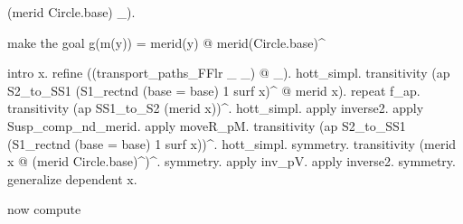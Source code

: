 \begin{coqdoccode}
\begin{coqdoccomment}
(merid\coqdocindent{0.50em}
Circle.base)\coqdocindent{0.50em}
\_).\coqdoceol
\coqdoceol
\coqdocindent{1.00em}
\begin{coqdoccomment}
\coqdocindent{0.50em}
make\coqdocindent{0.50em}
the\coqdocindent{0.50em}
goal\coqdocindent{0.50em}
g(m(y))\coqdocindent{0.50em}
=\coqdocindent{0.50em}
merid(y)\coqdocindent{0.50em}
@\coqdocindent{0.50em}
merid(Circle.base)\^{}\coqdocindent{0.50em}
\end{coqdoccomment}
\coqdoceol
\coqdocindent{1.00em}
intro\coqdocindent{0.50em}
x.\coqdoceol
\coqdocindent{2.00em}
refine\coqdocindent{0.50em}
((transport\_paths\_FFlr\coqdocindent{0.50em}
\_\coqdocindent{0.50em}
\_)\coqdocindent{0.50em}
@\coqdocindent{0.50em}
\_).\coqdocindent{0.50em}
hott\_simpl.\coqdoceol
\coqdocindent{2.00em}
transitivity\coqdocindent{0.50em}
(ap\coqdocindent{0.50em}
S2\_to\_SS1\coqdocindent{0.50em}
(S1\_rectnd\coqdocindent{0.50em}
(base\coqdocindent{0.50em}
=\coqdocindent{0.50em}
base)\coqdocindent{0.50em}
1\coqdocindent{0.50em}
surf\coqdocindent{0.50em}
x)\^{}\coqdocindent{0.50em}
@\coqdocindent{0.50em}
merid\coqdocindent{0.50em}
x).\coqdoceol
\coqdocindent{2.00em}
repeat\coqdocindent{0.50em}
f\_ap.\coqdoceol
\coqdocindent{2.00em}
transitivity\coqdocindent{0.50em}
(ap\coqdocindent{0.50em}
SS1\_to\_S2\coqdocindent{0.50em}
(merid\coqdocindent{0.50em}
x))\^{}.\coqdocindent{0.50em}
hott\_simpl.\coqdoceol
\coqdocindent{2.00em}
apply\coqdocindent{0.50em}
inverse2.\coqdoceol
\coqdocindent{2.00em}
apply\coqdocindent{0.50em}
Susp\_comp\_nd\_merid.\coqdoceol
\coqdocindent{2.00em}
apply\coqdocindent{0.50em}
moveR\_pM.\coqdoceol
\coqdocindent{2.00em}
transitivity\coqdocindent{0.50em}
(ap\coqdocindent{0.50em}
S2\_to\_SS1\coqdocindent{0.50em}
(S1\_rectnd\coqdocindent{0.50em}
(base\coqdocindent{0.50em}
=\coqdocindent{0.50em}
base)\coqdocindent{0.50em}
1\coqdocindent{0.50em}
surf\coqdocindent{0.50em}
x))\^{}.\coqdocindent{0.50em}
hott\_simpl.\coqdoceol
\coqdocindent{2.00em}
symmetry.\coqdocindent{0.50em}
transitivity\coqdocindent{0.50em}
(merid\coqdocindent{0.50em}
x\coqdocindent{0.50em}
@\coqdocindent{0.50em}
(merid\coqdocindent{0.50em}
Circle.base)\^{})\^{}.\coqdoceol
\coqdocindent{2.00em}
symmetry.\coqdocindent{0.50em}
apply\coqdocindent{0.50em}
inv\_pV.\coqdocindent{0.50em}
apply\coqdocindent{0.50em}
inverse2.\coqdocindent{0.50em}
symmetry.\coqdoceol
\coqdocindent{1.00em}
generalize\coqdocindent{0.50em}
dependent\coqdocindent{0.50em}
x.\coqdoceol
\coqdoceol
\coqdocindent{1.00em}
\begin{coqdoccomment}
\coqdocindent{0.50em}
now\coqdocindent{0.50em}
compute\coqdocindent{0.50em}

\end{coqdoccomment}
\end{coqdoccomment}
\end{coqdoccode}
